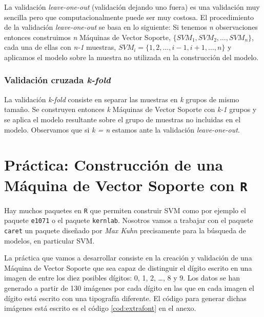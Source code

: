 \documentclass[12pt,spanish,a4paper]{article}
\numberwithin{equation}{section}
\begin{document}
La validación \emph{leave-one-out} (validación dejando uno fuera) es una
validación muy sencilla pero que computacionalmente puede ser muy
costosa. El procedimiento de la validación \emph{leave-one-out} se basa
en lo siguiente: Si tenemos \emph{n} observaciones entonces construimos
\emph{n} Máquinas de Vector Soporte,
\(\{SVM_1, SVM_2, \ldots, SVM_n\}\), cada una de ellas con \emph{n-1}
muestras, \(SVM_i = \{1, 2, \ldots, i-1, i+1, \ldots, n \}\) y aplicamos
el modelo sobre la muestra no utilizada en la construcción del modelo.

\subsubsection{\texorpdfstring{Validación cruzada
\emph{k-fold}}{Validación cruzada k-fold}}\label{validacion-cruzada-k-fold}

La validación \emph{k-fold} consiste en separar las muestras en \emph{k}
grupos de mismo tamaño. Se construyen entonces \emph{k} Máquinas de
Vector Soporte con \emph{k-1} grupos y se aplica el modelo resultante
sobre el grupo de muestras no incluidas en el modelo. Observamos que si
\emph{k = n} estamos ante la validación \emph{leave-one-out}.

\clearpage
\newpage

\section{\texorpdfstring{Práctica: Construcción de una Máquina de Vector
Soporte con
\texttt{R}}{Práctica: Construcción de una Máquina de Vector Soporte con R}}\label{practica-construccion-de-una-maquina-de-vector-soporte-con-r}

Hay muchos paquetes en \texttt{R} que permiten construir SVM como por
ejemplo el paquete \texttt{e1071} o el paquete \texttt{kernlab}.
Nosotros vamos a trabajar con el paquete \texttt{caret} un paquete
diseñado por \emph{Max Kuhn} precisamente para la búsqueda de modelos,
en particular SVM.

La práctica que vamos a desarrollar consiste en la creación y validación
de una Máquina de Vector Soporte que sea capaz de distinguir el dígito
escrito en una imagen de entre los diez posibles dígitos: 0, 1, 2,
\ldots{}, 8 y 9. Los datos se han generado a partir de 130 imágenes por
cada dígito en las que en cada imagen el dígito está escrito con una
tipografía diferente. El código para generar dichas imágenes está
escrito es el código \ref{cod:extrafont} en el anexo.
\end{document}
